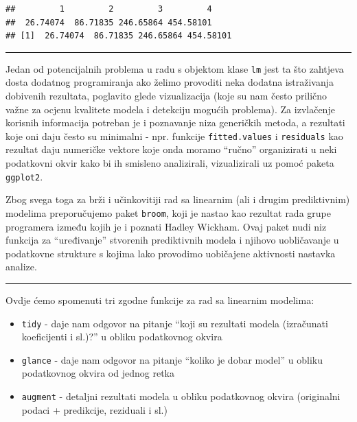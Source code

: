 \documentclass[]{book}
\providecommand{\tightlist}{%
  \setlength{\itemsep}{0pt}\setlength{\parskip}{0pt}}
\theoremstyle{definition}
\theoremstyle{definition}
\theoremstyle{definition}
\theoremstyle{remark}
\begin{document}
\begin{verbatim}
##         1         2         3         4 
##  26.74074  86.71835 246.65864 454.58101 
## [1]  26.74074  86.71835 246.65864 454.58101
\end{verbatim}

\begin{center}\rule{0.5\linewidth}{\linethickness}\end{center}

Jedan od potencijalnih problema u radu s objektom klase \texttt{lm} jest
ta što zahtjeva dosta dodatnog programiranja ako želimo provoditi neka
dodatna istraživanja dobivenih rezultata, poglavito glede vizualizacija
(koje su nam često prilično važne za ocjenu kvalitete modela i detekciju
mogućih problema). Za izvlačenje korisnih informacija potreban je i
poznavanje niza generičkih metoda, a rezultati koje oni daju često su
minimalni - npr. funkcije \texttt{fitted.values} i \texttt{residuals}
kao rezultat daju numeričke vektore koje onda moramo ``ručno''
organizirati u neki podatkovni okvir kako bi ih smisleno analizirali,
vizualizirali uz pomoć paketa \texttt{ggplot2}.

Zbog svega toga za brži i učinkovitiji rad sa linearnim (ali i drugim
prediktivnim) modelima preporučujemo paket \texttt{broom}, koji je
nastao kao rezultat rada grupe programera između kojih je i poznati
Hadley Wickham. Ovaj paket nudi niz funkcija za ``uređivanje'' stvorenih
prediktivnih modela i njihovo uobličavanje u podatkovne strukture s
kojima lako provodimo uobičajene aktivnosti nastavka analize.

\begin{center}\rule{0.5\linewidth}{\linethickness}\end{center}

Ovdje ćemo spomenuti tri zgodne funkcije za rad sa linearnim modelima:

\begin{itemize}
\tightlist
\item
  \texttt{tidy} - daje nam odgovor na pitanje ``koji su rezultati modela
  (izračunati koeficijenti i sl.)?'' u obliku podatkovnog okvira
\item
  \texttt{glance} - daje nam odgovor na pitanje ``koliko je dobar
  model'' u obliku podatkovnog okvira od jednog retka
\item
  \texttt{augment} - detaljni rezultati modela u obliku podatkovnog
  okvira (originalni podaci + predikcije, reziduali i sl.)
\end{itemize}
\end{document}
